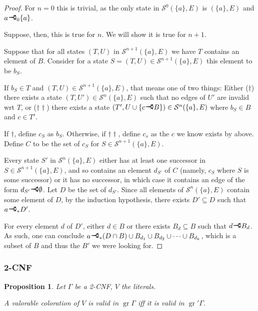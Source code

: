 \documentclass[11pt]{article}
\newcommand{\cS}{\mathcal{S}}
\DeclareMathOperator{\gr}{gr}
\newcommand{\rightcurveor}{
\!
\mathrel{
  \begin{tikzpicture}[scale=0.8]
    \draw[thick,->] (0,0) arc (90:150:-2ex);
    \draw[thick,->] (0,0) arc (90:30:2ex);
    \draw[thick] (-1ex, 0) -- (0.1ex,0);
  \end{tikzpicture}
}\!
}
\newtheorem{prop}{Proposition}
\begin{document}
\begin{proof}
For $n = 0$ this is trivial, as the only state in $\cS^0 (\{a\}, E)$ is $(\{a\}, E)$ and $a \rightcurveor_0 \{a\}$.

Suppose, then, this is true for $n$. We will show it is true for $n+1$.

Suppose that for all states $(T,U)$ in $\cS^{n+1} (\{a\}, E)$ we have $T$ contains an element of $B$. Consider for a state $S = (T,U) \in \cS^{n+1} (\{a\}, E)$ this element to be $b_S$.

If $b_S \in T$ and $(T,U) \in \cS^{n+1} (\{a\}, E)$, that means one of two things: Either ($\dag$) there exists a state $(T, U') \in \cS^n (\{a\}, E)$ such that no edges of $U'$ are invalid wrt $T$, or ($\dag\dag$) there exists a state $(T',U \cup \{c \rightcurveor B\}) \in \cS^n (\{a\}, E)$ where $b_S \in B$ and $c \in T'$.

If $\dag$, define $c_S$ as $b_S$. Otherwise, if $\dag\dag$, define $c_s$ as the $c$ we know exists by above. Define $C$ to be the set of $c_S$ for $S \in \cS^{n+1} (\{a\}, E)$.

Every state $S'$ in $\cS^n (\{a\}, E)$ either has at least one successor in $S \in \cS^{n+1} (\{a\}, E)$, and so contains an element $d_{S'}$ of $C$ (namely, $c_S$ where $S$ is some successor) or it has no successor, in which case it contains an edge of the form $d_{S'} \rightcurveor \emptyset$. Let $D$ be the set of $d_{S'}$. Since all elements of $\cS^n (\{a\}, E)$ contain some element of $D$, by the induction hypothesis, there exists $D' \subseteq D$ such that $a \rightcurveor_* D'$.

For every element $d$ of $D'$, either $d \in B$ or there exists $B_d \subseteq B$ such that $d \rightcurveor B_d$. As such, one can conclude $a \rightcurveor_* (D \cap B) \cup B_{d_1} \cup B_{d_2} \cup \cdots \cup B_{d_k}$, which is a subset of $B$ and thus the $B'$ we were looking for.

\end{proof}

\subsubsection{2-CNF}

\begin{prop}
Let $\Gamma$ be a 2-CNF, $V$ the literals.

A valorable coloration of $V$ is valid in $\gr \Gamma$ iff it is valid in $\gr' \Gamma$.
\end{prop}
\end{document}
